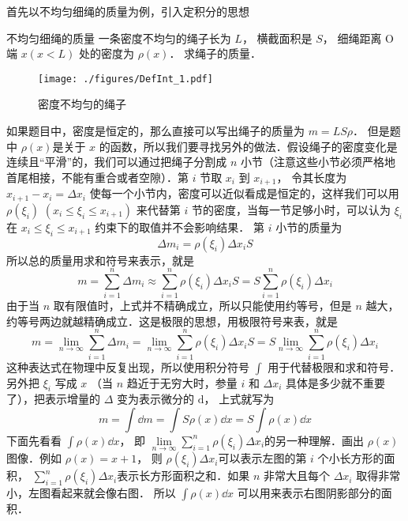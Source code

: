 
首先以不均匀细绳的质量为例，引入定积分的思想

\begin{example}{不均匀细绳的质量}\label{DefInt_ex1}
一条密度不均匀的绳子长为 $L$， 横截面积是 $S$， 细绳距离 O 端 $x (x<L) $ 处的密度为 $\rho(x)$． 求绳子的质量．

\begin{figure}[ht]
\centering
\texttt{[image: ./figures/DefInt\_1.pdf]}
\caption{密度不均匀的绳子}
\end{figure}

如果题目中，密度是恒定的，那么直接可以写出绳子的质量为 $m = LS\rho$． 但是题中 $\rho(x)$是关于 $x$ 的函数，所以我们要寻找另外的做法．假设绳子的密度变化是连续且“平滑”的，我们可以通过把绳子分割成 $n$ 小节（注意这些小节必须严格地首尾相接，不能有重合或者空隙）．第 $i$ 节取 $x_i$ 到 $x_{i +1}$， 令其长度为 $x_{i + 1} - {x_i} = \Delta x_i$ 使每一个小节内，密度可以近似看成是恒定的，这样我们可以用 $\rho(\xi_i)\,\, (x_i \leqslant \xi_i \leqslant x_{i + 1})$ 来代替第 $i$ 节的密度，当每一节足够小时，可以认为 $\xi_i$ 在 $x_i \leqslant \xi_i \leqslant x_{i + 1}$ 约束下的取值并不会影响结果． 第 $i$ 小节的质量为
\begin{equation}
\Delta {m_i} = \rho (\xi_i)\Delta {x_i}S 
\end{equation}
所以总的质量用求和符号来表示，就是
\begin{equation}
m = \sum_{i = 1}^n \Delta m_i  \approx \sum_{i = 1}^n \rho(\xi_i)\Delta x_i S   = S \sum_{i = 1}^n \rho (\xi_i)\Delta x_i
\end{equation}
由于当 $n$ 取有限值时，上式并不精确成立，所以只能使用约等号，但是 $n$ 越大，约等号两边就越精确成立．这是极限的思想，用极限符号来表，就是
\begin{equation}
m = \lim_{n \to \infty } \sum_{i = 1}^n {\Delta {m_i}}  = \lim_{n \to \infty } \sum_{i = 1}^n \rho(\xi_i)\Delta {x_i}S   = S   \lim_{n \to \infty } \sum_{i = 1}^n \rho(\xi_i)\Delta {x_i}
\end{equation}
这种表达式在物理中反复出现，所以使用积分符号 $\int {} $ 用于代替极限和求和符号．另外把 ${\xi_i}$ 写成 $x$ （当 $n$ 趋近于无穷大时，参量 $i$ 和 $\Delta {x_i}$ 具体是多少就不重要了），把表示增量的 $\Delta $ 变为表示微分的 $\mathrm{d}$， 上式就写为
\begin{equation}
m = \int \dd{m}  = \int S\rho(x) \dd{x}  = S\int \rho(x) \dd{x}
\end{equation}
下面先看看 $\int \rho(x) \dd{x}$， 即 $\lim\limits_{n \to \infty } \sum\limits_{i = 1}^n \rho(\xi_i)\Delta {x_i}$的另一种理解．画出 $\rho (x)$图像．例如 $\rho(x) = x + 1$， 则 $\rho(\xi_i)\Delta {x_i}$可以表示左图的第 $i$ 个小长方形的面积， $\sum\limits_{i = 1}^n \rho(\xi_i)\Delta x_i$表示长方形面积之和．如果 $n$ 非常大且每个 $\Delta x_i$ 取得非常小，左图看起来就会像右图． 所以 $\int \rho(x) \dd{x}$ 可以用来表示右图阴影部分的面积．


\end{example}
